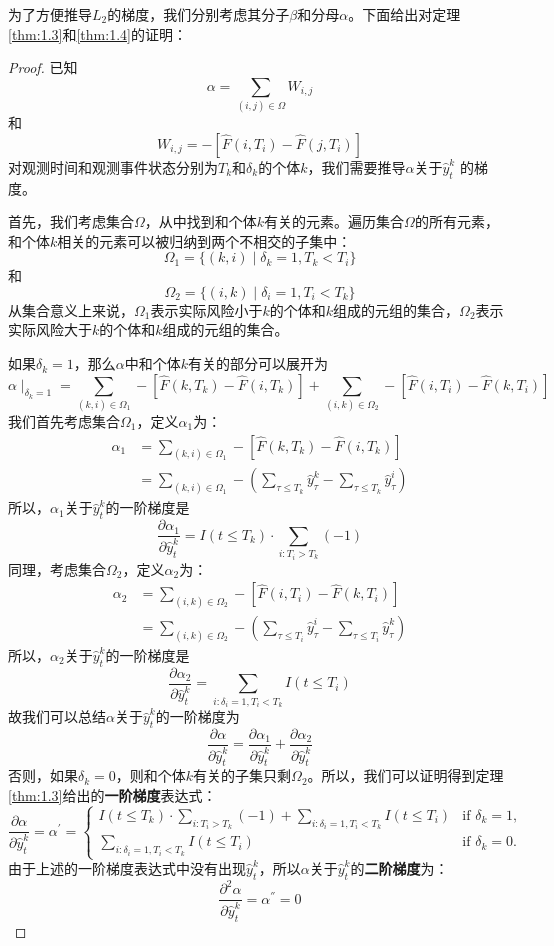 为了方便推导$L_2$的梯度，我们分别考虑其分子$\beta$和分母$\alpha$。下面给出对定理\ref{thm:1.3}和\ref{thm:1.4}的证明：
\begin{proof}
已知$$\alpha = \sum_{(i,j)\in \Omega} W_{i,j}$$ 和 $$W_{i,j} = -\left[ \hat{F}(i, T_i) - \hat{F}(j, T_i) \right]$$ 对观测时间和观测事件状态分别为$T_k$和$\delta_k$的个体$k$，我们需要推导$\alpha$关于$\hat{y}_t^k$ 的梯度。

首先，我们考虑集合$\Omega$，从中找到和个体$k$有关的元素。遍历集合$\Omega$的所有元素，和个体$k$相关的元素可以被归纳到两个不相交的子集中：$$\Omega_1=\{(k,i) \mid \delta_k=1,T_k < T_i\}$$ 和 $$\Omega_2=\{(i,k) \mid \delta_i=1,T_i < T_k\}$$ 从集合意义上来说，$\Omega_1$表示实际风险小于$k$的个体和$k$组成的元组的集合，$\Omega_2$表示实际风险大于$k$的个体和$k$组成的元组的集合。

如果$\delta_k = 1$，那么$\alpha$中和个体$k$有关的部分可以展开为$$\alpha \mid_{\delta_k=1}=\sum_{(k,i)\in \Omega_1} -\left[ \hat{F}(k, T_k) - \hat{F}(i, T_k) \right] + \sum_{(i,k)\in \Omega_2} -\left[ \hat{F}(i, T_i) - \hat{F}(k, T_i) \right] $$ 我们首先考虑集合$\Omega_1$，定义$\alpha_1$为：\[
\begin{split}
\alpha_1 &= \sum_{(k,i)\in \Omega_1} -\left[ \hat{F}(k, T_k) - \hat{F}(i, T_k) \right] \\
         &= \sum_{(k,i)\in \Omega_1} - ( \sum_{\tau \le T_k} \hat{y}_{\tau}^k - \sum_{\tau \le T_k} \hat{y}_{\tau}^i )
\end{split}
\] 所以，$\alpha_1$关于$\hat{y}_t^k$的一阶梯度是$$\frac{\partial \alpha_1}{\partial \hat{y}_t^k} = I(t\le T_k)\cdot {\sum\limits_{i: T_i>T_k}(-1)}$$ 同理，考虑集合$\Omega_2$，定义$\alpha_2$为：\[
\begin{split}
\alpha_2 &= \sum_{(i,k)\in \Omega_2} -\left[ \hat{F}(i, T_i) - \hat{F}(k, T_i) \right] \\
         &= \sum_{(i,k)\in \Omega_2} - ( \sum_{\tau \le T_i} \hat{y}_{\tau}^i - \sum_{\tau \le T_i} \hat{y}_{\tau}^k )
\end{split}
\] 所以，$\alpha_2$关于$\hat{y}_t^k$的一阶梯度是$$\frac{\partial \alpha_2}{\partial \hat{y}_t^k} = \sum\limits_{i: \delta_i=1,T_i<T_k} I(t\le T_i)$$ 故我们可以总结$\alpha$关于$\hat{y}_t^k$的一阶梯度为$$\frac{\partial \alpha}{\partial \hat{y}_t^k} = \frac{\partial \alpha_1}{\partial \hat{y}_t^k} + \frac{\partial \alpha_2}{\partial \hat{y}_t^k}$$ 否则，如果$\delta_k = 0$，则和个体$k$有关的子集只剩$\Omega_2$。所以，我们可以证明得到定理\ref{thm:1.3}给出的\textbf{一阶梯度}表达式：$$
\frac{\partial \alpha}{\partial \hat{y}_t^k}=\alpha^{'}=
\begin{cases}
I(t\le T_k)\cdot {\sum\limits_{i: T_i>T_k}(-1)} + \sum\limits_{i: \delta_i=1,T_i<T_k} I(t\le T_i) & \text{if } \delta_k = 1,\\
\sum\limits_{i: \delta_i=1,T_i<T_k} I(t\le T_i) & \text{if } \delta_k = 0.
\end{cases}
$$ 由于上述的一阶梯度表达式中没有出现$\hat{y}_t^k$，所以$\alpha$关于$\hat{y}_t^k$的\textbf{二阶梯度}为：$$
\frac{\partial^2 \alpha}{\partial \hat{y}_t^k}=\alpha^{''}=0
$$


\end{proof}
